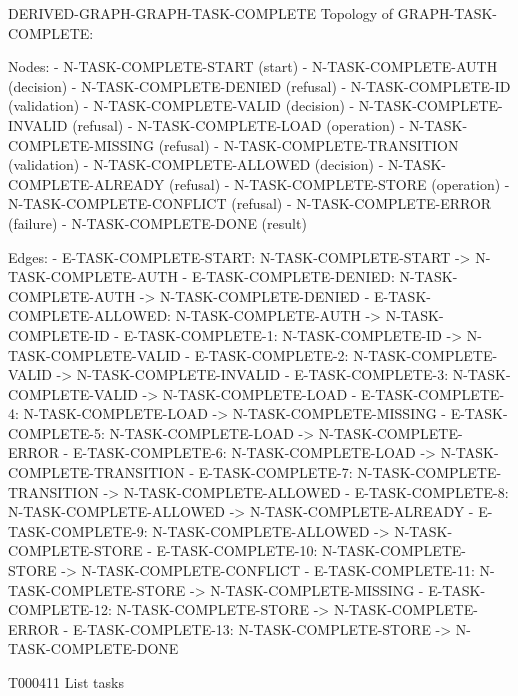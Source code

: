 \documentclass[11pt,a4paper]{article}
\begin{document}
\begin{atlasderived}{DERIVED-GRAPH-GRAPH-TASK-COMPLETE}
Topology of GRAPH-TASK-COMPLETE:

Nodes:
- N-TASK-COMPLETE-START (start)
- N-TASK-COMPLETE-AUTH (decision)
- N-TASK-COMPLETE-DENIED (refusal)
- N-TASK-COMPLETE-ID (validation)
- N-TASK-COMPLETE-VALID (decision)
- N-TASK-COMPLETE-INVALID (refusal)
- N-TASK-COMPLETE-LOAD (operation)
- N-TASK-COMPLETE-MISSING (refusal)
- N-TASK-COMPLETE-TRANSITION (validation)
- N-TASK-COMPLETE-ALLOWED (decision)
- N-TASK-COMPLETE-ALREADY (refusal)
- N-TASK-COMPLETE-STORE (operation)
- N-TASK-COMPLETE-CONFLICT (refusal)
- N-TASK-COMPLETE-ERROR (failure)
- N-TASK-COMPLETE-DONE (result)

Edges:
- E-TASK-COMPLETE-START: N-TASK-COMPLETE-START -> N-TASK-COMPLETE-AUTH
- E-TASK-COMPLETE-DENIED: N-TASK-COMPLETE-AUTH -> N-TASK-COMPLETE-DENIED
- E-TASK-COMPLETE-ALLOWED: N-TASK-COMPLETE-AUTH -> N-TASK-COMPLETE-ID
- E-TASK-COMPLETE-1: N-TASK-COMPLETE-ID -> N-TASK-COMPLETE-VALID
- E-TASK-COMPLETE-2: N-TASK-COMPLETE-VALID -> N-TASK-COMPLETE-INVALID
- E-TASK-COMPLETE-3: N-TASK-COMPLETE-VALID -> N-TASK-COMPLETE-LOAD
- E-TASK-COMPLETE-4: N-TASK-COMPLETE-LOAD -> N-TASK-COMPLETE-MISSING
- E-TASK-COMPLETE-5: N-TASK-COMPLETE-LOAD -> N-TASK-COMPLETE-ERROR
- E-TASK-COMPLETE-6: N-TASK-COMPLETE-LOAD -> N-TASK-COMPLETE-TRANSITION
- E-TASK-COMPLETE-7: N-TASK-COMPLETE-TRANSITION -> N-TASK-COMPLETE-ALLOWED
- E-TASK-COMPLETE-8: N-TASK-COMPLETE-ALLOWED -> N-TASK-COMPLETE-ALREADY
- E-TASK-COMPLETE-9: N-TASK-COMPLETE-ALLOWED -> N-TASK-COMPLETE-STORE
- E-TASK-COMPLETE-10: N-TASK-COMPLETE-STORE -> N-TASK-COMPLETE-CONFLICT
- E-TASK-COMPLETE-11: N-TASK-COMPLETE-STORE -> N-TASK-COMPLETE-MISSING
- E-TASK-COMPLETE-12: N-TASK-COMPLETE-STORE -> N-TASK-COMPLETE-ERROR
- E-TASK-COMPLETE-13: N-TASK-COMPLETE-STORE -> N-TASK-COMPLETE-DONE
\end{atlasderived}
\par{}\hypertarget{technical-GRAPH-TASK-LIST}{}
\begin{atlastext}{T000411}
List tasks
\end{atlastext}
\par{}
\end{document}
